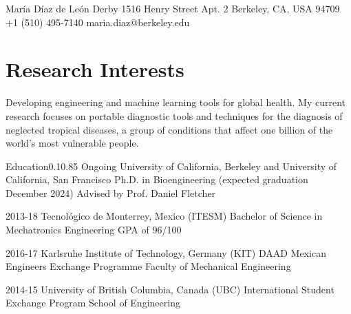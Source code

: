 \documentclass{federico_cv}
\begin{document}
\contact
{María Díaz de León Derby}
{1516 Henry Street Apt. 2}
{Berkeley, CA, USA 94709}
{+1 (510) 495-7140} %
{maria.diaz@berkeley.edu} %



\section{Research Interests}
Developing engineering and machine learning tools for global health. My current research focuses on portable diagnostic tools and techniques for the diagnosis of neglected tropical diseases, a group of conditions that affect one billion of the world's most vulnerable people.


\begin{tblSection}{Education}{0.1}{0.85}
\degree
{Ongoing}
{University of California, Berkeley and University of California, San Francisco}
{Ph.D. in Bioengineering (expected graduation December 2024)}
{Advised by Prof. Daniel Fletcher}

\degree
{2013-18}
{Tecnológico de Monterrey, Mexico (ITESM)}
{Bachelor of Science in Mechatronics Engineering}
{GPA of 96/100}

\degree
{2016-17}
{Karlsruhe Institute of Technology, Germany (KIT)}
{DAAD Mexican Engineers Exchange Programme}
{Faculty of Mechanical Engineering}

\degree
{2014-15}
{University of British Columbia, Canada (UBC)}
{International Student Exchange Program}
{School of Engineering}

\end{tblSection}
\end{document}
